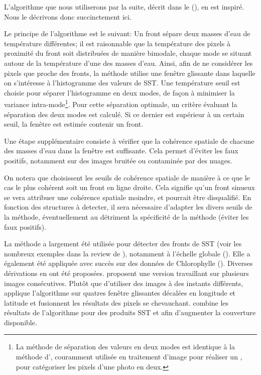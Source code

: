 \begin{technique}
L'algorithme que nous utiliserons par la suite, décrit dans le  (), en est inspiré. Nous le décrivons donc succinctement ici.

Le principe de l'algorithme  est le suivant: Un front sépare deux masses d'eau de température différentes; il est raisonnable que la température des pixels à proximité du front soit distribuées de manière bimodale, chaque mode se situant autour de la température d'une des masses d'eau.
Ainsi, afin de ne considérer les pixels que proche des fronts, la méthode utilise une fenêtre glissante dans laquelle on s'intéresse à l'histogramme des valeurs de SST.
Une température seuil est choisie pour séparer l'histogramme en deux modes, de façon à minimiser la variance intra-mode\footnote{%
  La méthode de séparation des valeurs en deux modes est identique à la méthode d'\textcite{otsu_1979}, couramment utilisée en traitement d'image pour réaliser un ,  pour catégoriser les pixels d'une photo en deux.
}.
Pour cette séparation optimale, un critère évaluant la séparation des deux modes est calculé. Si ce dernier est supérieur à un certain seuil, la fenêtre est estimée contenir un front.

Une étape supplémentaire consiste à vérifier que la cohérence spatiale de chacune des masses d'eau dans la fenêtre est suffisante.
Cela permet d'éviter les faux positifs, notamment sur des images bruitée ou contaminée par des nuages.

  On notera que \textcite{cayula_1992} choisissent les seuils de cohérence spatiale de manière à ce que le cas le plus cohérent soit un front en ligne droite.
  Cela signifie qu'un front sinueux se vera attribuer une cohérence spatiale moindre, et pourrait être disqualifié.
  En fonction des structures à detecter, il sera nécessaire d'adapter les divers seuils de la méthode, éventuellement au détriment la spécificité de la méthode (éviter les faux positifs).

\end{technique}

La méthode  a largement été utilisée pour détecter des fronts de SST (voir les nombreux exemples dans la review de \cite{belkin_2021}), notamment à l'échelle globale (\cite{belkin_2009a,belkin_2007}).
Elle a également été appliquée avec succès sur des données de Chlorophylle (\cite{stegmann_2004,kahru_2012,bontempi_2004}).
Diverses dérivations en ont été proposées.
\textcite{cayula_1995} proposent une version travaillant sur plusieurs images consécutives.
Plutôt que d'utiliser des images à des instants différents, \textcite{nieto_2012} applique l'algorithme  sur quatres fenêtre glissantes décalées en longitude et latitude et fusionnent les résultats des pixels se chevauchant.
\textcite{miller_2009} combine les résultats de l'algorithme  pour des produits SST et  afin d'augmenter la couverture disponible.

